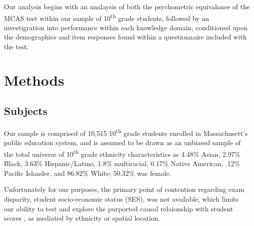 \documentclass{article}\usepackage[]{graphicx}\usepackage[]{color}
\begin{document}
Our analysis begins with an analaysis of both the psychometric equivalance of the MCAS test within our sample of 10\textsuperscript{th} grade students, followed by an investigration into  performance within each knowledge domain, conditioned upon the demographics and item responses found within a questionnaire included with the test.
\section{Methods}
\subsection{Subjects}
Our sample is comprised of 10,515 10\textsuperscript{th} grade students enrolled in Massachusett's public education system, and is assumed to be drawn as an unbiased sample of the total universe of 10\textsuperscript{th} grade ethnicity characteristics as 4.48\% Asian, 2.97\% Black, 3.63\% Hispanic/Latino, 1.8\% multiracial, 0.17\% Native American, .12\% Pacific Islander, and 86.82\% White; 50.32\% was female.

Unfortunately for our purposes, the primary point of contention regarding exam disparity, student socio-economic status (SES), was not available, which limits our ability to test and explore the purported causal relaionship with student scores \cite{Gaudet}, as mediated by ethnicity or spatial location. 
\end{document}
